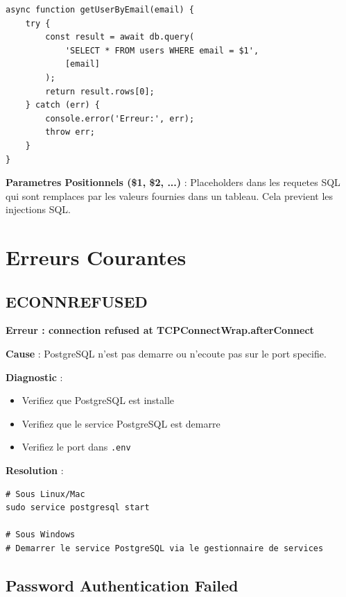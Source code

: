 \documentclass[a4paper,12pt]{book}
\begin{document}
\begin{lstlisting}[style=javascript, caption=Requete avec parametres (recommande)]
async function getUserByEmail(email) {
    try {
        const result = await db.query(
            'SELECT * FROM users WHERE email = $1',
            [email]
        );
        return result.rows[0];
    } catch (err) {
        console.error('Erreur:', err);
        throw err;
    }
}
\end{lstlisting}

\begin{definitionbox}
    \textbf{Parametres Positionnels (\$1, \$2, ...)} : Placeholders dans les requetes SQL qui sont remplaces par les valeurs fournies dans un tableau. Cela previent les injections SQL.
\end{definitionbox}

\section{Erreurs Courantes}

\subsection{ECONNREFUSED}

\begin{errorbox}
    \textbf{Erreur : connection refused at TCPConnectWrap.afterConnect}

    \textbf{Cause} : PostgreSQL n'est pas demarre ou n'ecoute pas sur le port specifie.

    \textbf{Diagnostic} :
    \begin{itemize}
        \item Verifiez que PostgreSQL est installe
        \item Verifiez que le service PostgreSQL est demarre
        \item Verifiez le port dans \texttt{.env}
    \end{itemize}

    \textbf{Resolution} :
    \begin{lstlisting}[style=bash]
# Sous Linux/Mac
sudo service postgresql start

# Sous Windows
# Demarrer le service PostgreSQL via le gestionnaire de services
    \end{lstlisting}
\end{errorbox}

\subsection{Password Authentication Failed}
\end{document}
